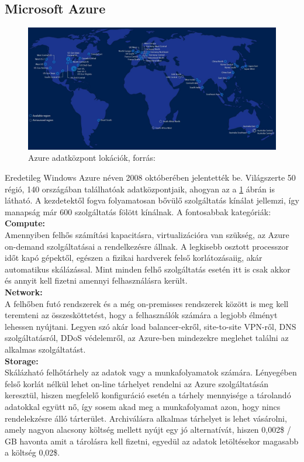 \documentclass[12pt,oneside,justify,table]{book}
\begin{document}
\subsection{Microsoft Azure}
\begin{figure}[H]
\centering
\includegraphics[width=1\textwidth]{azure_locations.jpg}
\caption{Azure adatközpont lokációk, forrás: \cite{Azure_Regions}}
\label{fig:AzureRegions}
\end{figure}
Eredetileg Windows Azure néven 2008 októberében jelentették be. Világszerte 50 régió, 140 országában találhatóak adatközpontjaik, ahogyan az a \ref{fig:AzureRegions} ábrán is látható. A kezdetektől fogva folyamatosan bővülő szolgáltatás kínálat jellemzi, így manapság már 600 szolgáltatás fölött kínálnak. A fontosabbak kategóriák: \cite{Azure_Services}\\

\noindent \textbf{Compute:}\\
Amennyiben felhős számítási kapacitásra, virtualizációra van szükség, az Azure on-demand szolgáltatásai a rendelkezésre állnak. A legkisebb osztott processzor időt kapó gépektől, egészen a fizikai hardverek felső korlátozásaiig, akár automatikus skálázással. Mint minden felhő szolgáltatás esetén itt is csak akkor és annyit kell fizetni amennyi felhasználásra került. \\

\noindent \textbf{Network:}\\
A felhőben futó rendszerek és a még on-premisses rendszerek között is meg kell teremteni az összesköttetést, hogy a felhasználók számára a legjobb élményt lehessen nyújtani. Legyen szó akár load balancer-ekről, site-to-site VPN-ről, DNS szolgáltatásról, DDoS védelemről, az Azure-ben mindezekre meglehet találni az alkalmas szolgáltatást.\\

\noindent \textbf{Storage:}\\
Skálázható felhőtárhely az adatok vagy a munkafolyamatok számára. Lényegében felső korlát nélkül lehet on-line tárhelyet rendelni az Azure szolgáltatásán keresztül, hiszen megfelelő konfiguráció esetén a tárhely mennyisége a tárolandó adatokkal együtt nő, így sosem akad meg a munkafolyamat azon, hogy nincs rendelekzésre álló tárterület. Archiválásra alkalmas tárhelyet is lehet vásárolni, amely nagyon alacsony költség mellett nyújt egy jó alternatívát, hiszen 0,002\$ / GB havonta amit a tárolásra kell fizetni, egyedül az adatok letöltésekor magasabb a költség 0,02\$. \\
\end{document}
